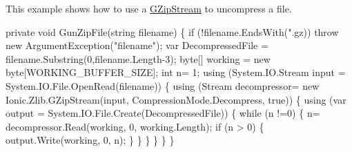 This example shows how to use a \mbox{\hyperlink{class_super_tiled2_unity_1_1_ionic_1_1_zlib_1_1_g_zip_stream}{G\+Zip\+Stream}} to uncompress a file. 
\begin{DoxyCode}
\textcolor{keyword}{private} \textcolor{keywordtype}{void} GunZipFile(\textcolor{keywordtype}{string} filename)
\{
    \textcolor{keywordflow}{if} (!filename.EndsWith(\textcolor{stringliteral}{".gz))}
\textcolor{stringliteral}{        throw new ArgumentException("}filename\textcolor{stringliteral}{");}
\textcolor{stringliteral}{    var DecompressedFile = filename.Substring(0,filename.Length-3);}
\textcolor{stringliteral}{    byte[] working = new byte[WORKING\_BUFFER\_SIZE];}
\textcolor{stringliteral}{    int n= 1;}
\textcolor{stringliteral}{    using (System.IO.Stream input = System.IO.File.OpenRead(filename))}
\textcolor{stringliteral}{    \{}
\textcolor{stringliteral}{        using (Stream decompressor= new Ionic.Zlib.GZipStream(input, CompressionMode.Decompress, true))}
\textcolor{stringliteral}{        \{}
\textcolor{stringliteral}{            using (var output = System.IO.File.Create(DecompressedFile))}
\textcolor{stringliteral}{            \{}
\textcolor{stringliteral}{                while (n !=0)}
\textcolor{stringliteral}{                \{}
\textcolor{stringliteral}{                    n= decompressor.Read(working, 0, working.Length);}
\textcolor{stringliteral}{                    if (n > 0)}
\textcolor{stringliteral}{                    \{}
\textcolor{stringliteral}{                        output.Write(working, 0, n);}
\textcolor{stringliteral}{                    \}}
\textcolor{stringliteral}{                \}}
\textcolor{stringliteral}{            \}}
\textcolor{stringliteral}{        \}}
\textcolor{stringliteral}{    \}}
\textcolor{stringliteral}{\}}
\end{DoxyCode}



